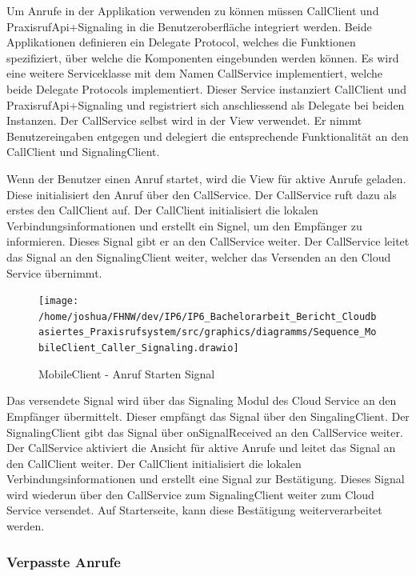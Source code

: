 Um Anrufe in der Applikation verwenden zu können müssen CallClient und PraxisrufApi+Signaling in die Benutzeroberfläche integriert werden.
Beide Applikationen definieren ein Delegate Protocol, welches die Funktionen spezifiziert, über welche die Komponenten eingebunden werden können.
Es wird eine weitere Serviceklasse mit dem Namen CallService implementiert, welche beide Delegate Protocols implementiert.
Dieser Service instanziert CallClient und PraxisrufApi+Signaling und registriert sich anschliessend als Delegate bei beiden Instanzen.
Der CallService selbst wird in der View verwendet.
Er nimmt Benutzereingaben entgegen und delegiert die entsprechende Funktionalität an den CallClient und SignalingClient.

Wenn der Benutzer einen Anruf startet, wird die View für aktive Anrufe geladen.
Diese initialisiert den Anruf über den CallService.
Der CallService ruft dazu als erstes den CallClient auf.
Der CallClient initialisiert die lokalen Verbindungsinformationen und erstellt ein Signel, um den Empfänger zu informieren.
Dieses Signal gibt er an den CallService weiter.
Der CallService leitet das Signal an den SignalingClient weiter, welcher das Versenden an den Cloud Service übernimmt.

\clearpage
\begin{figure}[h]
    \centering
    \begin{minipage}[b]{0.8\textwidth}
        \texttt{[image: /home/joshua/FHNW/dev/IP6/IP6\_Bachelorarbeit\_Bericht\_Cloudbasiertes\_Praxisrufsystem/src/graphics/diagramms/Sequence\_MobileClient\_Caller\_Signaling.drawio]}
        \caption{MobileClient - Anruf Starten Signal}
    \end{minipage}
\end{figure}

Das versendete Signal wird über das Signaling Modul des Cloud Service an den Empfänger übermittelt.
Dieser empfängt das Signal über den SingalingClient.
Der SignalingClient gibt das Signal über onSignalReceived an den CallService weiter.
Der CallService aktiviert die Ansicht für aktive Anrufe und leitet das Signal an den CallClient weiter.
Der CallClient initialisiert die lokalen Verbindungsinformationen und erstellt eine Signal zur Bestätigung.
Dieses Signal wird wiederun über den CallService zum SignalingClient weiter zum Cloud Service versendet.
Auf Starterseite, kann diese Bestätigung weiterverarbeitet werden.

\clearpage

\subsubsection{Verpasste Anrufe}

